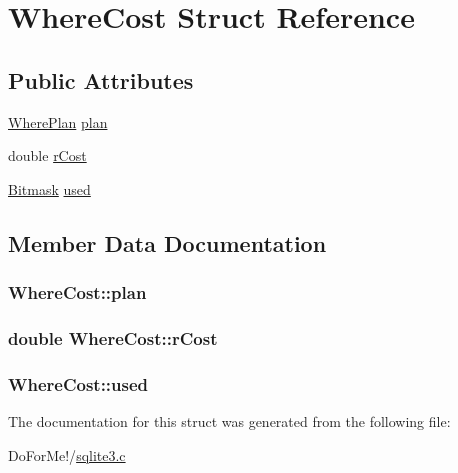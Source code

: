 \hypertarget{struct_where_cost}{\section{Where\-Cost Struct Reference}
\label{struct_where_cost}
}
\subsection*{Public Attributes}
\begin{DoxyCompactItemize}
\item 
\hyperlink{struct_where_plan}{Where\-Plan} \hyperlink{struct_where_cost_ace6ca770eb1f123bcbf2ce6433e69822}{plan}
\item 
double \hyperlink{struct_where_cost_a4dba436b417d0d562e0a32519befa824}{r\-Cost}
\item 
\hyperlink{sqlite3_8c_afa77b629897c4457bfdc47d364ba5c3f}{Bitmask} \hyperlink{struct_where_cost_ab041bae4d0f6cc76f427c82d3840bfae}{used}
\end{DoxyCompactItemize}


\subsection{Member Data Documentation}
\hypertarget{struct_where_cost_ace6ca770eb1f123bcbf2ce6433e69822}{
\subsubsection[{plan}]{ Where\-Cost\-::plan}}\label{struct_where_cost_ace6ca770eb1f123bcbf2ce6433e69822}
\hypertarget{struct_where_cost_a4dba436b417d0d562e0a32519befa824}{
\subsubsection[{r\-Cost}]{\setlength{\rightskip}{0pt plus 5cm}double Where\-Cost\-::r\-Cost}}\label{struct_where_cost_a4dba436b417d0d562e0a32519befa824}
\hypertarget{struct_where_cost_ab041bae4d0f6cc76f427c82d3840bfae}{
\subsubsection[{used}]{ Where\-Cost\-::used}}\label{struct_where_cost_ab041bae4d0f6cc76f427c82d3840bfae}


The documentation for this struct was generated from the following file\-:\begin{DoxyCompactItemize}
\item 
Do\-For\-Me!/\hyperlink{sqlite3_8c}{sqlite3.\-c}\end{DoxyCompactItemize}
